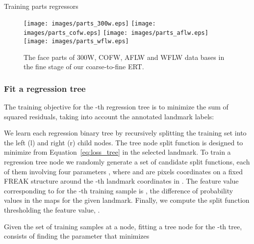 \documentclass[11pt,twocolumn]{article}
\begin{document}
\begin{algorithm}
\footnotesize
\caption{Training  parts regressors}
\label{alg:p_parts_regressors}
\end{algorithm}

\begin{figure}
\centering
\texttt{[image: images/parts\_300w.eps]}
\texttt{[image: images/parts\_cofw.eps]}
\texttt{[image: images/parts\_aflw.eps]}
\texttt{[image: images/parts\_wflw.eps]}
\caption{The  face parts of 300W, COFW, AFLW and WFLW data bases in the fine stage of our coarse-to-fine ERT.}
\label{fig:parts_configuration}
\end{figure}

\subsubsection{Fit a regression tree} 
The training objective for the -th regression tree is to minimize the sum of squared residuals, taking into account the annotated landmark labels:

We learn each regression binary tree by recursively splitting the training set into the left (l) and right (r) child nodes. The tree node split function is designed to minimize  from Equation~\ref{eq:loss_tree} in the selected landmark. To train a regression tree node we randomly generate a set of candidate split functions, each of them involving four parameters , where  and  are pixels coordinates on a fixed FREAK structure around the -th landmark coordinates in . The feature value corresponding to  for the -th training sample is , the difference of probability values in the maps for the given landmark.
Finally, we compute the split function thresholding the feature value, .

Given  the set of training samples at a node, fitting a tree node for the -th tree, consists of finding the parameter  that minimizes 
\end{document}
